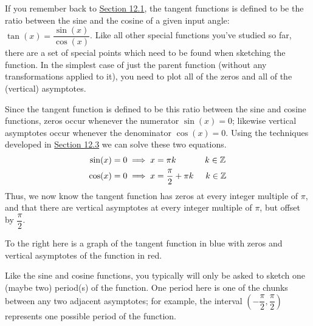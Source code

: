 \documentclass[lang=en,11pt]{elegantbook}
\begin{document}
If you remember back to \hyperlink{section.12.1}{Section 12.1}, the tangent functions is defined to be the ratio between the sine and the cosine of a given input angle: $\tan(x)=\dfrac{\sin(x)}{\cos(x)}$. Like all other special functions you've studied so far, there are a set of special points which need to be found when sketching the function. In the simplest case of just the parent function (without any transformations applied to it), you need to plot all of the zeros and all of the (vertical) asymptotes.

Since the tangent function is defined to be this ratio between the sine and cosine functions, zeros occur whenever the numerator $\sin⁡(x)=0$; likewise vertical asymptotes occur whenever the denominator $\cos⁡(x)=0$. Using the techniques developed in \hyperlink{section.12.3}{Section 12.3} we can solve these two equations. \begin{align*}
    \sin(x)=0 &\implies x=\pi k \hspace{12mm} k\in\mathbb{Z}\\ \cos(x)=0 &\implies x=\dfrac{\pi}{2}+\pi k \hspace{5mm} k\in\mathbb{Z}
\end{align*}
Thus, we now know the tangent function has zeros at every integer multiple of $\pi$, and that there are vertical asymptotes at every integer multiple of $\pi$, but offset by $\dfrac{\pi}{2}$.
\begin{wrapfigure}{r}{5cm}
\end{wrapfigure}
To the right here is a graph of the tangent function in blue with zeros and vertical asymptotes of the function in red.

\begin{note}
Like the sine and cosine functions, you typically will only be asked to sketch one (maybe two) period(s) of the function. One period here is one of the chunks between any two adjacent asymptotes; for example, the interval $\left(-\dfrac{\pi}{2},\dfrac{\pi}{2}\right)$ represents one possible period of the function.
\end{note}
\end{document}
